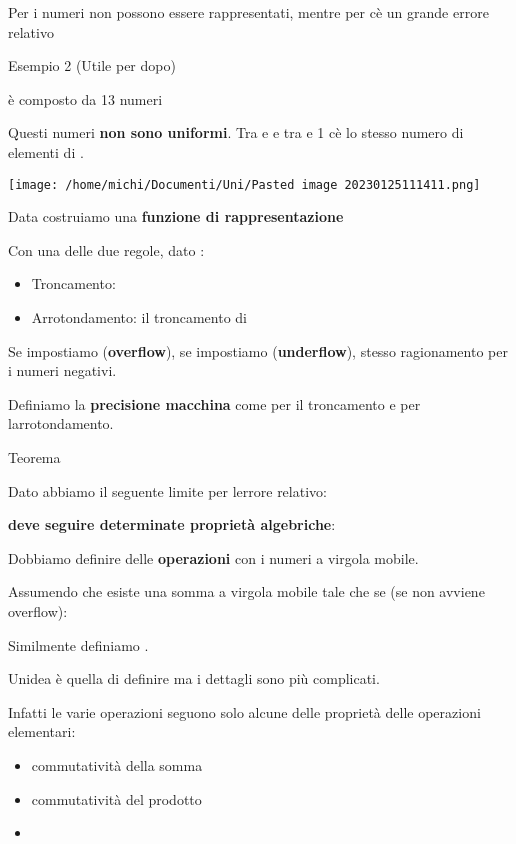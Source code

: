 \documentclass[
]{article}
\providecommand{\tightlist}{%
  \setlength{\itemsep}{0pt}\setlength{\parskip}{0pt}}
\begin{document}
Per {} i numeri non possono essere rappresentati, mentre per {}
c\textquotesingle è un grande errore relativo

Esempio 2 (Utile per dopo)

{} è composto da 13 numeri

Questi numeri \textbf{non sono uniformi}. Tra {} e {} e tra {} e 1
c\textquotesingle è lo stesso numero di elementi di {}.

\texttt{[image: /home/michi/Documenti/Uni/Pasted image 20230125111411.png]}

Data {} costruiamo una \textbf{funzione di rappresentazione}\\
{}

Con una delle due regole, dato {}:

\begin{itemize}
\tightlist
\item
  Troncamento: {}
\item
  Arrotondamento: {} il troncamento di {}
\end{itemize}

Se {} impostiamo {} (\textbf{overflow}), se {} impostiamo {}
(\textbf{underflow}), stesso ragionamento per i numeri negativi.

Definiamo la \textbf{precisione macchina} come {} per il troncamento e
{} per l\textquotesingle arrotondamento.

Teorema

Dato {} abbiamo il seguente limite per l\textquotesingle errore
relativo:\\
{}

\textbf{{} deve seguire determinate proprietà algebriche}:

{}

Dobbiamo definire delle \textbf{operazioni} con i numeri a virgola
mobile.

Assumendo che esiste una somma a virgola mobile {} tale che se {} (se
non avviene overflow):

{}

Similmente definiamo {}.

Un\textquotesingle idea è quella di definire {} ma i dettagli sono più
complicati.

Infatti le varie operazioni seguono solo alcune delle proprietà delle
operazioni elementari:

\begin{itemize}
\tightlist
\item
  commutatività della somma
\item
  commutatività del prodotto
\item
  {}
\end{itemize}
\end{document}
